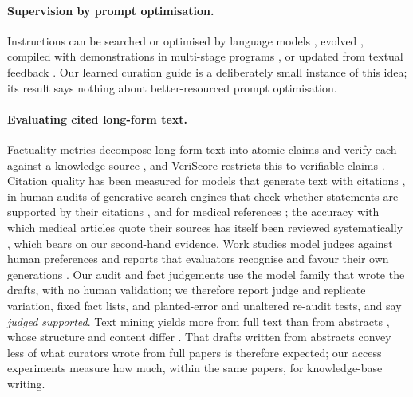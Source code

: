 \documentclass{article} %
\begin{document}
\paragraph{Supervision by prompt optimisation.}
Instructions can be searched or optimised by language models \citep{Zhou2022LargeLanguage,Pryzant2023AutomaticPrompt,Yang2023LargeLanguage}, evolved \citep{Guo2023EvopromptConnecting,Fernando2023PromptbreederSelfreferential,agrawal2026gepa}, compiled with demonstrations in multi-stage programs \citep{Khattab2023DspyCompiling,Opsahlong2024OptimizingInstructions}, or updated from textual feedback \citep{Yuksekgonul2024TextgradAutomatic}. Our learned curation guide is a deliberately small instance of this idea; its result says nothing about better-resourced prompt optimisation.

\paragraph{Evaluating cited long-form text.}
Factuality metrics decompose long-form text into atomic claims and verify each against a knowledge source \citep{min2023factscore,wei2024longform}, and VeriScore restricts this to verifiable claims \citep{Song2024VeriscoreEvaluating}. Citation quality has been measured for models that generate text with citations \citep{gao2023enabling}, in human audits of generative search engines that check whether statements are supported by their citations \citep{Liu2023EvaluatingVerifiability}, and for medical references \citep{wu2025automated}; the accuracy with which medical articles quote their sources has itself been reviewed systematically \citep{jergas2015quotation}, which bears on our second-hand evidence. Work studies model judges against human preferences \citep{zheng2023judging,shankar2024who} and reports that evaluators recognise and favour their own generations \citep{panickssery2024llm}. Our audit and fact judgements use the model family that wrote the drafts, with no human validation; we therefore report judge and replicate variation, fixed fact lists, and planted-error and unaltered re-audit tests, and say \emph{judged supported}. Text mining yields more from full text than from abstracts \citep{Westergaard2018ComprehensiveQuantitative}, whose structure and content differ \citep{Cohen2010StructuralContent}. That drafts written from abstracts convey less of what curators wrote from full papers is therefore expected; our access experiments measure how much, within the same papers, for knowledge-base writing.
\end{document}
